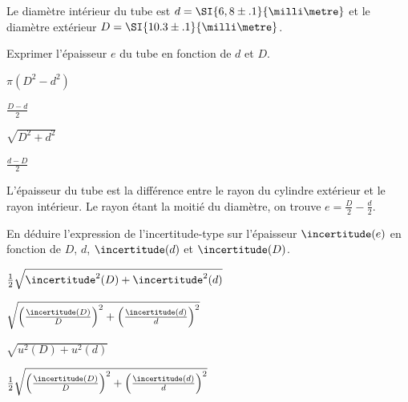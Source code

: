 Le diamètre intérieur du tube est $d = \SI{6,8\pm .1}{\milli\metre}$ et le diamètre extérieur $D= \SI{10.3\pm .1}{\milli\metre}$.


\begin{enonce}
  Exprimer l'épaisseur $e$ du tube en fonction de $d$ et $D$.
  \smallskip
  
  \begin{listeQCM4Colonnes}
    \item \(\pi (D^2 -d^2 ) \)
    \item \(\frac{D-d}{2} \)
    \item \(\sqrt{ D^2 +d^2 } \)
    \item \(\frac{d-D}{2} \)
  \end{listeQCM4Colonnes}
  \smallskip
\end{enonce}

\reponse{\reponseB{}}

\begin{corrige}
  L'épaisseur du tube est la différence entre le rayon du cylindre extérieur et le rayon intérieur. Le rayon étant la moitié du diamètre, on trouve \(e=\frac{D}{2}- \frac{d}{2}\).
\end{corrige}



\begin{enonce}
  En déduire l'expression de l'incertitude-type sur l'épaisseur $\incertitude(e)$ en fonction de \( D \), \( d \), \(\incertitude(d)\) et \(\incertitude(D)\).
  \smallskip
  
  \begin{listeQCM2Colonnes}
    \item  \( \frac12 \sqrt{\incertitude^2(D) + \incertitude^2(d) }\)\medskip
    \item \(  \sqrt{\left(\frac{\incertitude(D)}{D}\right)^2  + \left(\frac{\incertitude(d)}{d}\right)^2  }\)
    \item \(  \sqrt{u^2(D) + u^2(d) }\) \medskip
    \item \(  \frac12 \sqrt{\left(\frac{\incertitude(D)}{D}\right)^2  + \left(\frac{\incertitude(d)}{d}\right)^2  }\)
  \end{listeQCM2Colonnes}
  \smallskip
\end{enonce}

